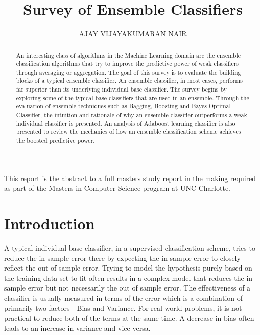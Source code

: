 \documentclass{acmtog} %
\begin{document}

\title{Survey of Ensemble Classifiers} %

\author{AJAY VIJAYAKUMARAN NAIR 
}


\maketitle

\begin{bottomstuff}
This report is the abstract to a full masters study report in the making required as part of the Masters in Computer Science program at UNC Charlotte.
\end{bottomstuff}


\begin{abstract}
An interesting class of algorithms in the Machine Learning domain are the ensemble classification algorithms that try to improve the predictive power of weak classifiers through averaging or aggregation. The goal of this survey is to evaluate the building blocks of a typical ensemble classifier. An ensemble classifier, in most cases, performs far superior than its underlying individual base classifier. The survey begins by exploring some of the typical base classifiers that are used in an ensemble. Through the evaluation of ensemble techniques such as Bagging, Boosting and Bayes Optimal Classifier, the intuition and rationale of why an ensemble classifier outperforms a weak individual classifier is presented. An analysis of Adaboost learning classifier is also presented to review the mechanics of how an ensemble classification scheme achieves the boosted predictive power.
\end{abstract}

\section{Introduction}
A typical individual base classifier, in a supervised classification scheme, tries to reduce the in sample error there by expecting the in sample error to closely reflect the out of sample error. Trying to model the hypothesis purely based on the training data set to fit often results in a complex model that reduces the in sample error but not necessarily the out of sample error. The effectiveness of a classifier is usually measured in terms of the error which is a combination of primarily two factors - Bias and Variance. For real world problems, it is not practical to reduce both of the terms at the same time. A decrease in bias often leads to an increase in variance and vice-versa.
\end{document}
